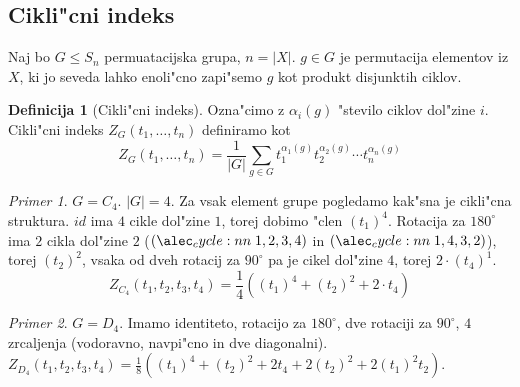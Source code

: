 \documentclass[a4paper,12pt]{article}
\theoremstyle{definition}
\newtheorem{defn}[counter]{Definicija}
\theoremstyle{remark}
\newtheorem*{ex}{Primer}
\begin{document}
\subsection{Cikli"cni indeks}
Naj bo $G \leq S_n$ permuatacijska grupa, $n=|X|$.
$g \in G$ je permutacija elementov iz $X$, ki jo seveda lahko enoli"cno zapi"semo $g$ kot produkt disjunktih ciklov.
\begin{defn}[Cikli"cni indeks]
	Ozna"cimo z $\alpha_i(g)$ "stevilo ciklov dol"zine $i$.
	Cikli"cni indeks $Z_G(t_1, \ldots, t_n)$ definiramo kot
	$$ Z_G(t_1, \ldots, t_n) = \frac{1}{|G|}\sum_{g \in G}t_1^{\alpha_1(g)}t_2^{\alpha_2(g)}\cdots t_n^{\alpha_n(g)} $$
\end{defn}
\begin{ex}
	$G=C_4$. $|G|=4$. Za vsak element grupe pogledamo kak"sna je cikli"cna struktura. $id$ ima $4$ cikle dol"zine $1$, torej dobimo "clen $(t_1)^4$. Rotacija za $180^{\circ}$ ima $2$ cikla dol"zine $2$ ($\cycle{1, 2, 3, 4}$ in $\cycle{1, 4, 3, 2}$), torej $(t_2)^2$, vsaka od dveh rotacij za $90^{\circ}$ pa je cikel dol"zine $4$, torej $2 \cdot (t_4)^1$.
	$$Z_{C_4}(t_1, t_2, t_3, t_4) = \frac{1}{4}((t_1)^4+(t_2)^2+2 \cdot t_4)$$
\end{ex}
\begin{ex}
	$G=D_4$. Imamo identiteto, rotacijo za $180^{\circ}$, dve rotaciji za $90^{\circ}$, $4$ zrcaljenja (vodoravno, navpi"cno in dve diagonalni). $Z_{D_4}(t_1, t_2, t_3, t_4) = \frac{1}{8}((t_1)^4+(t_2)^2+2t_4+2(t_2)^2+2(t_1)^2t_2)$.
\end{ex}
\end{document}
